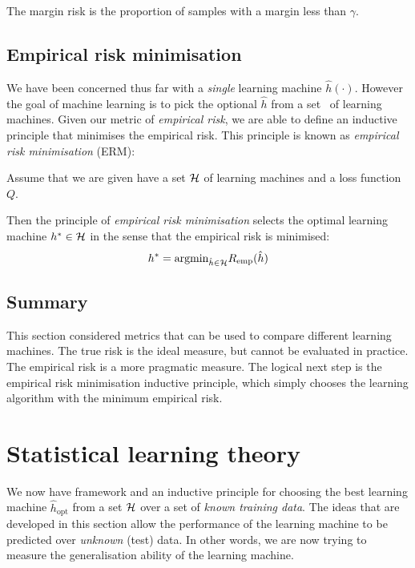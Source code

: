 The margin risk is the proportion of samples with a margin less than
$\gamma$.


\subsection{Empirical risk minimisation}
\label{sec:srm}
\label{acr:erm}

We have been concerned thus far with a \emph{single} learning
machine $\hat{h}(\cdot)$.  However the goal of machine learning is to
pick the optional $\hat{h}$  from a set \calH\ of learning machines.
Given our metric of \emph{empirical risk}, we are able to define an
inductive principle that minimises the empirical risk.  This principle
is known as \emph{empirical risk minimisation} (ERM):

\begin{definition}
Assume that we are given have a set $\mathcal{H}$ of learning machines and a
loss function $Q$.

Then the principle of \emph{empirical risk minimisation} selects the
optimal learning machine $h^{\ast} \in \mathcal{H}$ in the sense that
the empirical risk is minimised:
%
\begin{equation}
h^{\ast} = \mathrm{argmin}_{\hat{h} \in \mathcal{H}} R_{\mathrm{emp}}(\hat{h})
\label{eqn:erm}
\end{equation}
\end{definition}


\subsection{Summary}

This section considered metrics that can be used to compare different
learning machines.  The true risk is the ideal measure, but cannot be
evaluated in practice.  The empirical risk is a more pragmatic
measure.  The logical next step is the empirical risk minimisation
inductive principle, which simply chooses the learning algorithm with
the minimum empirical risk.





\section{Statistical learning theory}
\label{sec:slt}
\label{acr:slt}

We now have framework and an inductive principle for choosing the
best learning machine $\hat{h}_{\mbox{opt}}$ from a set $\mathcal{H}$ over a
set of \emph{known training data}.  The ideas that are developed in
this section allow the performance of the learning machine to be
predicted over \emph{unknown} (test) data.  In other words, we are now
trying to measure the generalisation ability of the learning machine.

